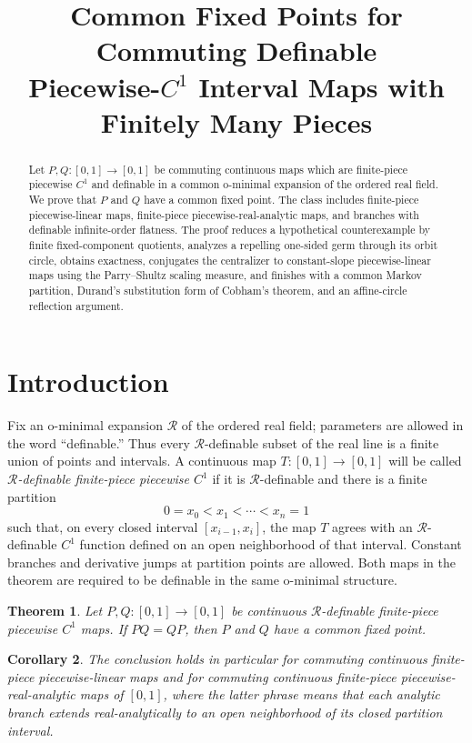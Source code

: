 \documentclass[11pt]{article}
\title{Common Fixed Points for Commuting Definable\\
Piecewise-\(C^1\) Interval Maps with Finitely Many Pieces}
\author{}
\date{}
\newtheorem{theorem}{Theorem}
\newtheorem{corollary}[theorem]{Corollary}
\theoremstyle{definition}
\theoremstyle{remark}
\newcommand{\I}{[0,1]}
\begin{document}
\maketitle

\begin{abstract}
Let $P,Q:[0,1]\to[0,1]$ be commuting continuous maps which are
finite-piece piecewise $C^1$ and definable in a common o-minimal expansion of
the ordered real field.  We prove that $P$ and $Q$ have a common fixed point.
The class includes finite-piece piecewise-linear maps, finite-piece
piecewise-real-analytic maps, and branches with definable infinite-order
flatness.  The proof reduces a hypothetical counterexample by finite
fixed-component quotients, analyzes a repelling one-sided germ through its
orbit circle, obtains exactness, conjugates the centralizer to constant-slope
piecewise-linear maps using the Parry--Shultz scaling measure, and finishes
with a common Markov partition, Durand's substitution form of Cobham's
theorem, and an affine-circle reflection argument.
\end{abstract}

\section*{Introduction}
Fix an o-minimal expansion $\mathcal R$ of the ordered real field; parameters
are allowed in the word ``definable.''  Thus every $\mathcal R$-definable
subset of the real line is a finite union of points and intervals.  A
continuous map $T\colon\I\to\I$ will be called
\emph{$\mathcal R$-definable finite-piece piecewise $C^1$} if it is
$\mathcal R$-definable and there is a finite partition
\[
 0=x_0<x_1<\cdots <x_n=1
\]
such that, on every closed interval $[x_{i-1},x_i]$, the map $T$ agrees
with an $\mathcal R$-definable $C^1$ function defined on an open
neighborhood of that interval.  Constant branches and derivative jumps at
partition points are allowed.  Both maps in the theorem are required to be
definable in the same o-minimal structure.

\begin{theorem}\label{thm:tame-C1}
Let $P,Q\colon\I\to\I$ be continuous $\mathcal R$-definable finite-piece
piecewise $C^1$ maps.  If $PQ=QP$, then $P$ and $Q$ have a common fixed
point.
\end{theorem}

\begin{corollary}\label{cor:analytic-PL}
The conclusion holds in particular for commuting continuous finite-piece
piecewise-linear maps and for commuting continuous finite-piece
piecewise-real-analytic maps of $[0,1]$, where the latter phrase means that
each analytic branch extends real-analytically to an open neighborhood of
its closed partition interval.
\end{corollary}
\end{document}
